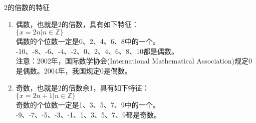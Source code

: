 \documentclass[aspectratio=169]{ctexbeamer} %
\date{\today}
\begin{document}
\begin{frame}[t]{2的倍数的特征}
\begin{spacing}{1.2}
\normalsize

\begin{enumerate}[label={\arabic*.}]
\item 偶数，也就是2的倍数，具有如下特征：\\
$\{x = 2n | n \in \mathbb Z\}$ \\
\alert{偶数的个位数一定是0、2、4、6、8中的一个。}\\
-10、-8、-6、-4、-2、0、2、4、6、8、10都是偶数。 \\
\alert{注意：2002年，国际数学协会(International Mathematical Association)规定0是偶数。2004年，我国规定0是偶数。}
\item 奇数，也就是2的倍数余1，具有如下特征：\\
$\{x = 2n+1 | n \in \mathbb Z\}$ \\
奇数的个位数一定是1、3、5、7、9中的一个。\\
-9、-7、-5、-3、-1、1、3、5、7、9都是奇数。 \\
\end{enumerate}

\end{spacing}
\end{frame}
\end{document}
